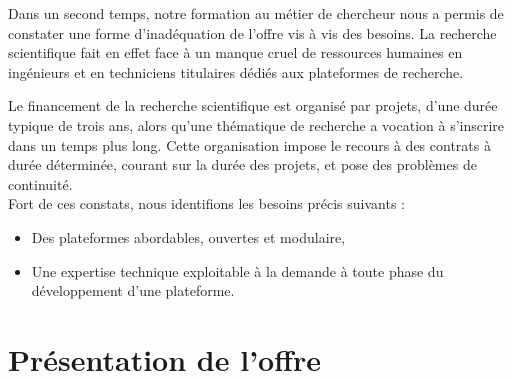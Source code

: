 \documentclass[a4paper,12pt]{report}
\begin{document}
Dans un second temps, notre formation au métier de chercheur nous a permis de constater une forme d'inadéquation de l'offre vis à vis des besoins.
La recherche scientifique fait en effet face à un manque cruel de ressources humaines en ingénieurs et en techniciens titulaires dédiés aux plateformes de recherche.

Le financement de la recherche scientifique est organisé par projets, d'une durée typique de trois ans, alors qu'une thématique de recherche a vocation à s'inscrire dans un temps plus long.
Cette organisation impose le recours à des contrats à durée déterminée, courant sur la durée des projets, et pose des problèmes de continuité.\\

Fort de ces constats, nous identifions les besoins précis suivants :
\begin{itemize}
	\item Des plateformes abordables, ouvertes et modulaire,
	\item Une expertise technique exploitable à la demande à toute phase du développement d'une plateforme.
\end{itemize}

\section{Présentation de l'offre}
\end{document}
